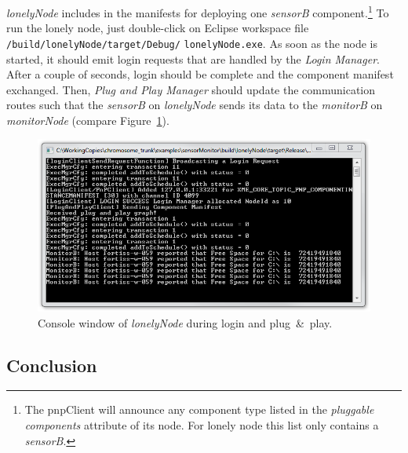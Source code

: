 \emph{lonelyNode} includes in the manifests for deploying one \emph{sensorB} component.\footnote{%
	The pnpClient will announce any component type listed in the \emph{pluggable components} attribute of its node. For lonely node this list only contains a \emph{sensorB}.
}
To run the lonely node, just double-click on Eclipse workspace file \verb|/build/lonelyNode/target/Debug/|
\verb|lonelyNode.exe|.
%
As soon as the node is started, it should emit login requests that are handled by the \emph{Login Manager}.
After a couple of seconds, login should be complete and the component manifest exchanged.
Then, \emph{Plug and Play Manager} should update the communication routes such that
the \emph{sensorB} on \emph{lonelyNode} sends its data to the \emph{monitorB} on \emph{monitorNode}
(compare Figure~\ref{fig:example_lonelyNode}).
%


\begin{figure}[htpb]
	\centering
	\includegraphics[scale=0.7]{figures/example_lonelyNode.png}
	\caption{Console window of \emph{lonelyNode} during login and plug~\&~play.}
	\label{fig:example_lonelyNode}
\end{figure}

\subsection{Conclusion}
\label{sec:example_lonelyNode:conclusion}

